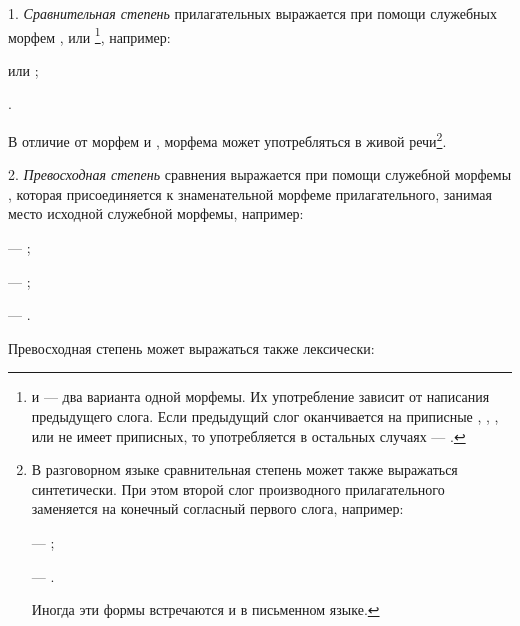 1. \emph{Сравнительная степень} прилагательных выражается при помощи служебных морфем ,  или \footnote[29]{ и  --- два варианта одной морфемы. Их употребление зависит от написания предыдущего слога. Если предыдущий слог оканчивается на приписные , , ,  или не имеет приписных, то употребляется  в остальных случаях --- .}, например:
\begin{prfsample}
    \item {} или ;
    \item {}.
\end{prfsample}
В отличие от морфем  и , морфема  может употребляться в живой речи\footnote[30]{В разговорном языке сравнительная степень может также выражаться синтетически. При этом второй слог производного прилагательного заменяется на конечный согласный первого слога, например:
\begin{prfsample}
    \item {} --- ;
    \item {} --- .
\end{prfsample}
Иногда эти формы встречаются и в письменном языке.}.

2. \emph{Превосходная степень} сравнения выражается при помощи служебной морфемы , которая присоединяется к знаменательной морфеме прилагательного, занимая место исходной служебной морфемы, например:
\begin{prfsample}
    \item {} --- ;
    \item {} --- ;
    \item {} --- .
\end{prfsample}

Превосходная степень может выражаться также лексически:

